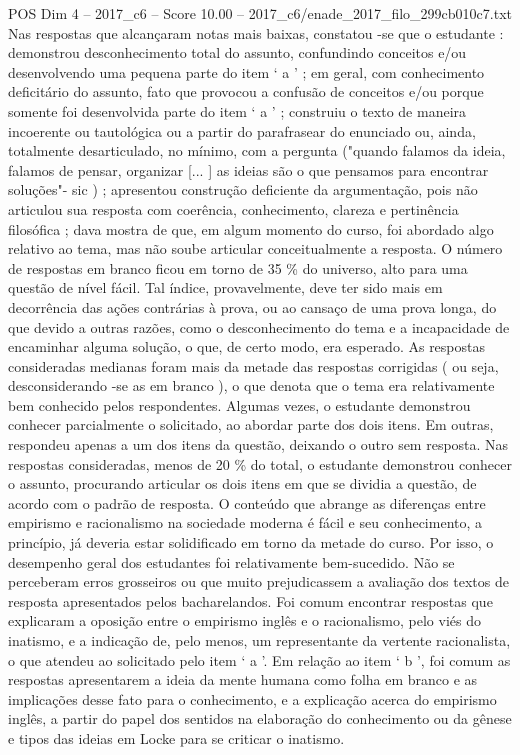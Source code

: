 \begin{textsample}{POS Dim 4 – 2017\_c6 – Score 10.00 – 2017\_c6/enade\_2017\_filo\_299cb010c7.txt}
Nas respostas que alcançaram notas mais baixas, constatou -se que o estudante : demonstrou desconhecimento total do assunto, confundindo conceitos e/ou desenvolvendo uma pequena parte do item ‘ a ’ ; em geral, com conhecimento deficitário do assunto, fato que provocou a confusão de conceitos e/ou porque somente foi desenvolvida parte do item ‘ a ’ ; construiu o texto de maneira incoerente ou tautológica ou a partir do parafrasear do enunciado ou, ainda, totalmente desarticulado, no mínimo, com a pergunta ("quando falamos da ideia, falamos de pensar, organizar [... ] as ideias são o que pensamos para encontrar soluções"- sic ) ; apresentou construção deficiente da argumentação, pois não articulou sua resposta com coerência, conhecimento, clareza e pertinência filosófica ; dava mostra de que, em algum momento do curso, foi abordado algo relativo ao tema, mas não soube articular conceitualmente a resposta.
O número de respostas em branco ficou em torno de 35 \% do universo, alto para uma questão de nível fácil.
Tal índice, provavelmente, deve ter sido mais em decorrência das ações contrárias à prova, ou ao cansaço de uma prova longa, do que devido a outras razões, como o desconhecimento do tema e a incapacidade de encaminhar alguma solução, o que, de certo modo, era esperado.
As respostas consideradas medianas foram mais da metade das respostas corrigidas ( ou seja, desconsiderando -se as em branco ), o que denota que o tema era relativamente bem conhecido pelos respondentes.
Algumas vezes, o estudante demonstrou conhecer parcialmente o solicitado, ao abordar parte dos dois itens.
Em outras, respondeu apenas a um dos itens da questão, deixando o outro sem resposta.
Nas respostas consideradas, menos de 20 \% do total, o estudante demonstrou conhecer o assunto, procurando articular os dois itens em que se dividia a questão, de acordo com o padrão de resposta.
O conteúdo que abrange as diferenças entre empirismo e racionalismo na sociedade moderna é fácil e seu conhecimento, a princípio, já deveria estar solidificado em torno da metade do curso.
Por isso, o desempenho geral dos estudantes foi relativamente bem-sucedido.
Não se perceberam erros grosseiros ou que muito prejudicassem a avaliação dos textos de resposta apresentados pelos bacharelandos.
Foi comum encontrar respostas que explicaram a oposição entre o empirismo inglês e o racionalismo, pelo viés do inatismo, e a indicação de, pelo menos, um representante da vertente racionalista, o que atendeu ao solicitado pelo item ‘ a ’.
Em relação ao item ‘ b ’, foi comum as respostas apresentarem a ideia da mente humana como folha em branco e as implicações desse fato para o conhecimento, e a explicação acerca do empirismo inglês, a partir do papel dos sentidos na elaboração do conhecimento ou da gênese e tipos das ideias em Locke para se criticar o inatismo.

\end{textsample}
